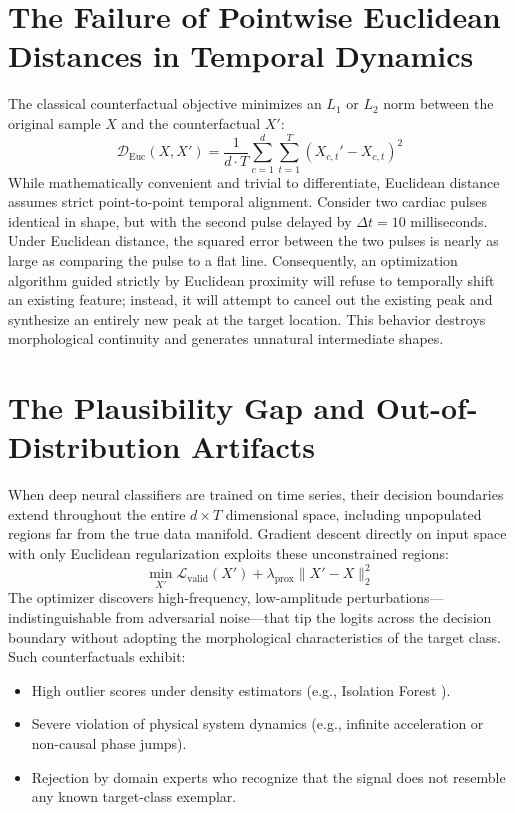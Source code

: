 \documentclass[11pt,a4paper]{report}
\begin{document}
\section{The Failure of Pointwise Euclidean Distances in Temporal Dynamics}
The classical counterfactual objective minimizes an $L_1$ or $L_2$ norm between the original sample $X$ and the counterfactual $X'$:
\begin{equation}
    \mathcal{D}_{\text{Euc}}(X, X') = \frac{1}{d \cdot T} \sum_{c=1}^d \sum_{t=1}^T (X_{c,t}' - X_{c,t})^2
\end{equation}
While mathematically convenient and trivial to differentiate, Euclidean distance assumes strict point-to-point temporal alignment. Consider two cardiac pulses identical in shape, but with the second pulse delayed by $\Delta t = 10$ milliseconds. Under Euclidean distance, the squared error between the two pulses is nearly as large as comparing the pulse to a flat line. Consequently, an optimization algorithm guided strictly by Euclidean proximity will refuse to temporally shift an existing feature; instead, it will attempt to cancel out the existing peak and synthesize an entirely new peak at the target location. This behavior destroys morphological continuity and generates unnatural intermediate shapes.

\section{The Plausibility Gap and Out-of-Distribution Artifacts}
When deep neural classifiers are trained on time series, their decision boundaries extend throughout the entire $d \times T$ dimensional space, including unpopulated regions far from the true data manifold. Gradient descent directly on input space with only Euclidean regularization exploits these unconstrained regions:
\begin{equation}
    \min_{X'} \mathcal{L}_{\text{valid}}(X') + \lambda_{\text{prox}} \|X' - X\|_2^2
\end{equation}
The optimizer discovers high-frequency, low-amplitude perturbations—indistinguishable from adversarial noise—that tip the logits across the decision boundary without adopting the morphological characteristics of the target class. Such counterfactuals exhibit:
\begin{itemize}
    \item High outlier scores under density estimators (e.g., Isolation Forest \cite{liu2008isolation}).
    \item Severe violation of physical system dynamics (e.g., infinite acceleration or non-causal phase jumps).
    \item Rejection by domain experts who recognize that the signal does not resemble any known target-class exemplar.
\end{itemize}
\end{document}
